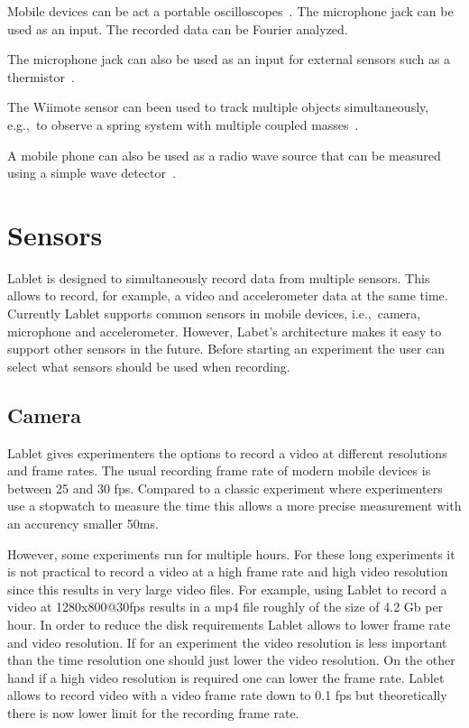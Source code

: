 \documentclass{sigchi}
\newcommand{\eg}{e.g.,\ }
\newcommand{\ie}{i.e.,\ }
\begin{document}
Mobile devices can be act a portable oscilloscopes~\cite{Forinash2012}.
The microphone jack can be used as an input.
The recorded data can be Fourier analyzed.

The microphone jack can also be used as an input for external sensors such as a thermistor~\cite{Forinash2012}.

The Wiimote sensor can been used to track multiple objects simultaneously, \eg to observe a spring system with multiple coupled masses~\cite{Skeffington2012}.

A mobile phone can also be used as a radio wave source that can be measured using a simple wave detector~\cite{Hare2010}.

\section{Sensors}
Lablet is designed to simultaneously record data from multiple sensors.
This allows to record, for example, a video and accelerometer data at the same time.
Currently Lablet supports common sensors in mobile devices, \ie camera, microphone and accelerometer.
However, Labet's architecture makes it easy to support other sensors in the future.
Before starting an experiment the user can select what sensors should be used when recording.

\subsection{Camera}
Lablet gives experimenters the options to record a video at different resolutions and frame rates.
The usual recording frame rate of modern mobile devices is between 25 and 30 fps.
Compared to a classic experiment where experimenters use a stopwatch to measure the time this allows a more precise measurement with an accurency smaller 50ms.

However, some experiments run for multiple hours.
For these long experiments it is not practical to record a video at a high frame rate and high video resolution since this results in very large video files.
For example, using Lablet to record a video at 1280x800@30fps results in a mp4 file roughly of the size of 4.2 Gb per hour.
In order to reduce the disk requirements Lablet allows to lower frame rate and video resolution.
If for an experiment the video resolution is less important than the time resolution one should just lower the video resolution.
On the other hand if a high video resolution is required one can lower the frame rate.
Lablet allows to record video with a video frame rate down to 0.1 fps but theoretically there is now lower limit for the recording frame rate.
\end{document}
